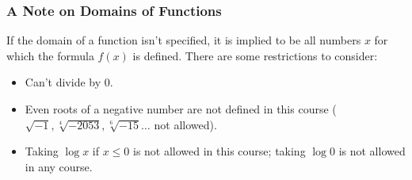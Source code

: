 \begin{frame}
\frametitle{A Note on Domains of Functions}
If the domain of a function isn't specified, it is implied to be all numbers $x$ for which the formula $f(x)$ is defined. There are some restrictions to consider:
\begin{itemize}
\item<2->  Can't divide by $0$.
\item<3->  Even roots of a negative number are not defined in this course ($\sqrt{-1} , \sqrt[4]{-2053}, \sqrt[6]{-15} \ldots$ not allowed).
\item<4->  Taking $\log x$ if $x \leq 0$ is not allowed in this course; taking  $\log 0$ is not allowed in any course.
\end{itemize}
\end{frame}


